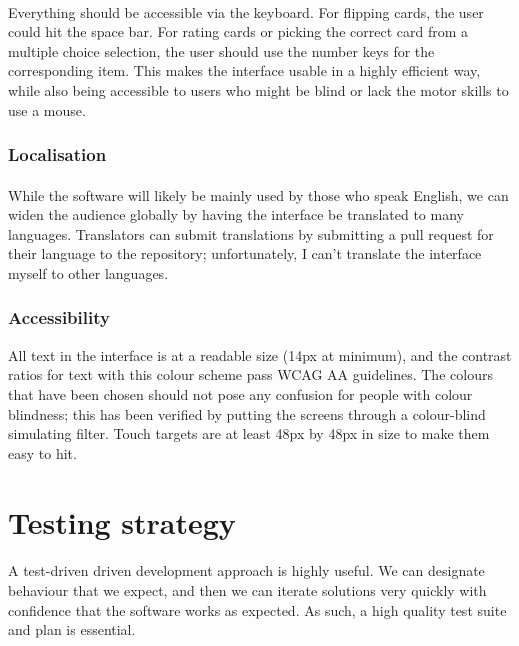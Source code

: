 \documentclass{report}
\begin{document}
\paragraph{}
Everything should be accessible via the keyboard. For flipping cards, the user could hit the space bar. For rating cards or picking the correct card from a multiple choice selection, the user should use the number keys for the corresponding item. This makes the interface usable in a highly efficient way, while also being accessible to users who might be blind or lack the motor skills to use a mouse.

\subsubsection{Localisation}
\paragraph{}
While the software will likely be mainly used by those who speak English, we can widen the audience globally by having the interface be translated to many languages. Translators can submit translations by submitting a pull request for their language to the repository; unfortunately, I can't translate the interface myself to other languages.

\subsubsection{Accessibility}
All text in the interface is at a readable size (14px at minimum), and the contrast ratios for text with this colour scheme pass WCAG AA guidelines. The colours that have been chosen should not pose any confusion for people with colour blindness; this has been verified by putting the screens through a colour-blind simulating filter. Touch targets are at least 48px by 48px in size to make them easy to hit.

\section{Testing strategy}
\paragraph{}
A test-driven driven development approach is highly useful. We can designate behaviour that we expect, and then we can iterate solutions very quickly with confidence that the software works as expected. As such, a high quality test suite and plan is essential.
\end{document}
